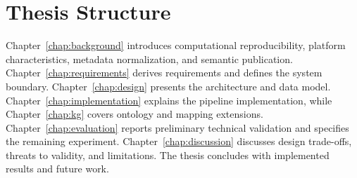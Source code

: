 \section{Thesis Structure}

Chapter~\ref{chap:background} introduces computational reproducibility, platform characteristics, metadata normalization, and semantic publication. Chapter~\ref{chap:requirements} derives requirements and defines the system boundary. Chapter~\ref{chap:design} presents the architecture and data model. Chapter~\ref{chap:implementation} explains the pipeline implementation, while Chapter~\ref{chap:kg} covers ontology and mapping extensions. Chapter~\ref{chap:evaluation} reports preliminary technical validation and specifies the remaining experiment. Chapter~\ref{chap:discussion} discusses design trade-offs, threats to validity, and limitations. The thesis concludes with implemented results and future work.
